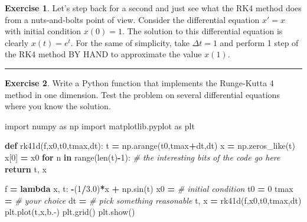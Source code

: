 \documentclass[
]{book}
\newenvironment{Shaded}{\begin{snugshade}}{\end{snugshade}}
\newcommand{\BuiltInTok}[1]{#1}
\newcommand{\CommentTok}[1]{\textcolor[rgb]{0.56,0.35,0.01}{\textit{#1}}}
\newcommand{\ControlFlowTok}[1]{\textcolor[rgb]{0.13,0.29,0.53}{\textbf{#1}}}
\newcommand{\DecValTok}[1]{\textcolor[rgb]{0.00,0.00,0.81}{#1}}
\newcommand{\FloatTok}[1]{\textcolor[rgb]{0.00,0.00,0.81}{#1}}
\newcommand{\ImportTok}[1]{#1}
\newcommand{\KeywordTok}[1]{\textcolor[rgb]{0.13,0.29,0.53}{\textbf{#1}}}
\newcommand{\NormalTok}[1]{#1}
\newcommand{\OperatorTok}[1]{\textcolor[rgb]{0.81,0.36,0.00}{\textbf{#1}}}
\newcommand{\StringTok}[1]{\textcolor[rgb]{0.31,0.60,0.02}{#1}}
\theoremstyle{definition}
\theoremstyle{definition}
\theoremstyle{definition}
\newtheorem{exercise}{Exercise}[chapter]
\theoremstyle{remark}
\begin{document}
\begin{exercise}
\protect\hypertarget{exr:unnamed-chunk-459}{}{\label{exr:unnamed-chunk-459} }Let's step back for a second and just see what the RK4 method does from a nuts-and-bolts point of view. Consider the differential equation \(x' = x\) with initial condition \(x(0) = 1\). The solution to this differential equation is clearly \(x(t) = e^t\). For the same of simplicity, take \(\Delta t = 1\) and perform 1 step of the RK4 method BY HAND to approximate the value \(x(1)\).
\end{exercise}

\begin{center}\rule{0.5\linewidth}{0.5pt}\end{center}

\begin{exercise}
\protect\hypertarget{exr:unnamed-chunk-460}{}{\label{exr:unnamed-chunk-460} }Write a Python function that implements the Runge-Kutta 4 method in one dimension. Test the problem on several differential equations where you know the solution.
\end{exercise}

\begin{Shaded}
\begin{Highlighting}[]
\ImportTok{import}\NormalTok{ numpy }\ImportTok{as}\NormalTok{ np}
\ImportTok{import}\NormalTok{ matplotlib.pyplot }\ImportTok{as}\NormalTok{ plt}

\KeywordTok{def}\NormalTok{ rk41d(f,x0,t0,tmax,dt):}
\NormalTok{    t }\OperatorTok{=}\NormalTok{ np.arange(t0,tmax}\OperatorTok{+}\NormalTok{dt,dt)}
\NormalTok{    x }\OperatorTok{=}\NormalTok{ np.zeros\_like(t)}
\NormalTok{    x[}\DecValTok{0}\NormalTok{] }\OperatorTok{=}\NormalTok{ x0}
    \ControlFlowTok{for}\NormalTok{ n }\KeywordTok{in} \BuiltInTok{range}\NormalTok{(}\BuiltInTok{len}\NormalTok{(t)}\OperatorTok{{-}}\DecValTok{1}\NormalTok{):}
        \CommentTok{\# the interesting bits of the code go here}
    \ControlFlowTok{return}\NormalTok{ t, x}

\NormalTok{f }\OperatorTok{=} \KeywordTok{lambda}\NormalTok{ x, t: }\OperatorTok{{-}}\NormalTok{(}\DecValTok{1}\OperatorTok{/}\FloatTok{3.0}\NormalTok{)}\OperatorTok{*}\NormalTok{x }\OperatorTok{+}\NormalTok{ np.sin(t)}
\NormalTok{x0 }\OperatorTok{=} \CommentTok{\# initial condition}
\NormalTok{t0 }\OperatorTok{=} \DecValTok{0}
\NormalTok{tmax }\OperatorTok{=} \CommentTok{\# your choice}
\NormalTok{dt }\OperatorTok{=} \CommentTok{\# pick something reasonable}
\NormalTok{t, x }\OperatorTok{=}\NormalTok{ rk41d(f,x0,t0,tmax,dt)}
\NormalTok{plt.plot(t,x,}\StringTok{\textquotesingle{}b.{-}\textquotesingle{}}\NormalTok{)}
\NormalTok{plt.grid()}
\NormalTok{plt.show()}
\end{Highlighting}
\end{Shaded}
\end{document}
